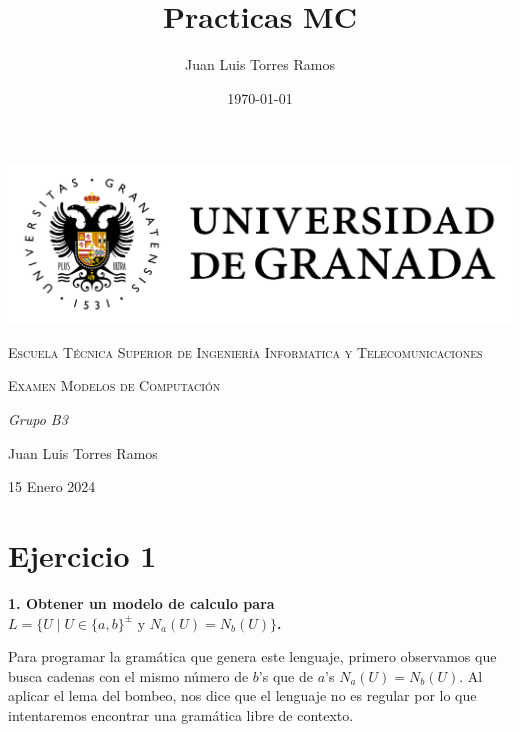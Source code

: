 \documentclass{article}
\title{Practicas MC}
\date{\today}
\author{Juan Luis Torres Ramos}
\begin{document}
        

        \begin{titlepage}
            \centering
            {\includegraphics[width=1\textwidth]{./Imagenes/logo_universidad_de_granada.png}\par}
            \vspace{1cm}
            {\scshape\Large Escuela Técnica Superior de Ingeniería Informatica y Telecomunicaciones \par}
            \vspace{2.5cm}
            {\scshape\Huge Examen Modelos de Computación \par}
            \vspace{1cm}
            {\itshape\Large  Grupo B3 \par} 
            \vfill
            {\Large Juan Luis Torres Ramos \par}
            \vspace{0.5cm}
            {\large 15 Enero 2024 \par}
        \end{titlepage}



        \section*{Ejercicio 1}
            \textbf{1. Obtener un modelo de calculo para $L = \{ U \mid U \in \{a, b\}^{\pm} \text{ y } N_a(U) = N_b(U) \}$.}
            
            
            \vspace{\baselineskip} %

            Para programar la gramática que genera este lenguaje, primero observamos que busca cadenas con el mismo número de $b$'s que de $a$'s $N_a(U) = N_b(U)$. 
            Al aplicar el lema del bombeo, nos dice que el lenguaje no es regular por lo que intentaremos encontrar una gramática libre de contexto. 
            \vspace{\baselineskip} %
\end{document}
